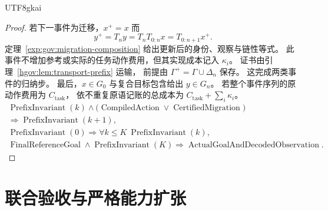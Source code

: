 \documentclass[12pt,a4paper,openany,notitlepage]{report}
\theoremstyle{plain}
\theoremstyle{definition}
\theoremstyle{remark}
\begin{document}
\begin{CJK*}{UTF8}{gkai}
\begin{proof}
若下一事件为迁移，$x^+=x$ 而
\[
 y^+=T_ny=T_nT_{0:n}x=T_{0:n+1}x^+.
\]
定理~\ref{exp:gov:migration-composition} 给出更新后的身份、观察与链性等式。
此事件不增加参考或实际的任务动作费用，但其实现成本记入 $\kappa_i$。
证书由引理~\ref{hgov:lem:transport-prefix} 运输，
前提由 $\Gamma^+=\Gamma\cup\Delta_n$ 保存。
这完成两类事件的归纳步。
最后，$x\in G_0$ 与复合目标包含给出 $y\in G_n$。
若整个事件序列的原动作费用为 $C_{\mathrm{task}}$，
依不重复原语记账的总成本为
$C_{\mathrm{task}}+\sum_i\kappa_i$。
\[
\begin{gathered}
 \operatorname{PrefixInvariant}(k)\land
 \bigl(\operatorname{CompiledAction}\lor\operatorname{CertifiedMigration}\bigr)\\
 \Rightarrow\operatorname{PrefixInvariant}(k+1),\\
 \operatorname{PrefixInvariant}(0)
 \Rightarrow\forall k\le K\ \operatorname{PrefixInvariant}(k),\\
 \operatorname{FinalReferenceGoal}\land\operatorname{PrefixInvariant}(K)
 \Rightarrow\operatorname{ActualGoalAndDecodedObservation}.
\end{gathered}
\]
\end{proof}

\section{联合验收与严格能力扩张}
\label{exp:gov:joint-section}


\end{CJK*}
\end{document}
